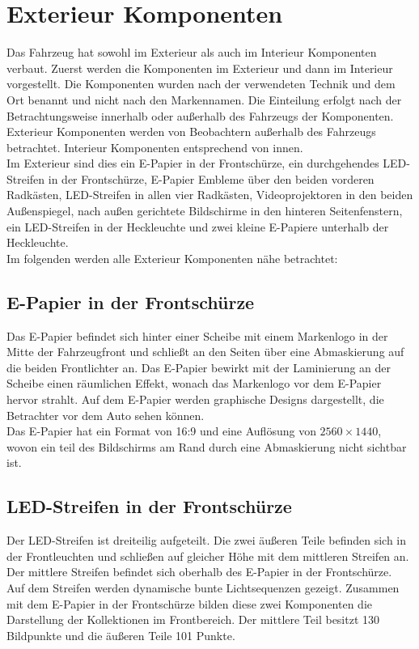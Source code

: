 \section{Exterieur Komponenten}
Das Fahrzeug hat sowohl im Exterieur als auch im Interieur Komponenten verbaut. Zuerst werden die Komponenten im Exterieur und dann im Interieur vorgestellt. Die Komponenten wurden nach der verwendeten Technik und dem Ort benannt und nicht nach den Markennamen. Die Einteilung erfolgt nach der Betrachtungsweise innerhalb oder außerhalb des Fahrzeugs der Komponenten. Exterieur Komponenten werden von Beobachtern außerhalb des Fahrzeugs betrachtet. Interieur Komponenten entsprechend von innen.\\
Im Exterieur sind dies ein E-Papier in der Frontschürze, ein durchgehendes LED-Streifen in der Frontschürze, E-Papier Embleme über den beiden vorderen Radkästen, LED-Streifen in allen vier Radkästen, Videoprojektoren in den beiden Außenspiegel, nach außen gerichtete Bildschirme in den hinteren Seitenfenstern, ein LED-Streifen in der Heckleuchte und zwei kleine E-Papiere unterhalb der Heckleuchte.\\
Im folgenden werden alle Exterieur Komponenten nähe betrachtet:
\subsection{E-Papier in der Frontschürze}
Das E-Papier befindet sich hinter einer Scheibe mit einem Markenlogo in der Mitte der Fahrzeugfront und schließt an den Seiten über eine Abmaskierung auf die beiden Frontlichter an. Das E-Papier bewirkt mit der Laminierung an der Scheibe einen räumlichen Effekt, wonach das Markenlogo vor dem E-Papier hervor strahlt.
Auf dem E-Papier werden graphische Designs dargestellt, die Betrachter vor dem Auto sehen können.\\
Das E-Papier hat ein Format von 16:9 und eine Auflösung von $ 2560\times 1440 $, wovon ein teil des Bildschirms am Rand durch eine Abmaskierung nicht sichtbar ist.
\subsection{LED-Streifen in der Frontschürze}
Der LED-Streifen ist dreiteilig aufgeteilt. Die zwei äußeren Teile befinden sich in der Frontleuchten und schließen auf gleicher Höhe mit dem mittleren Streifen an. Der mittlere Streifen befindet sich oberhalb des E-Papier in der Frontschürze. \\
Auf dem Streifen werden dynamische bunte Lichtsequenzen gezeigt.
Zusammen mit dem E-Papier in der Frontschürze bilden diese zwei Komponenten die Darstellung der Kollektionen im Frontbereich.
Der mittlere Teil besitzt 130 Bildpunkte und die äußeren Teile 101 Punkte.
